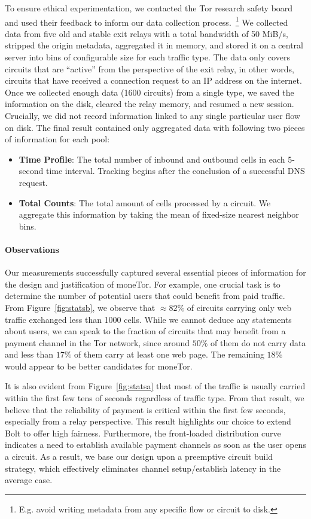 To ensure ethical experimentation, we contacted the Tor research safety board~\cite{torsafety} and used their feedback to inform our data collection process.~\footnote{E.g.
avoid writing metadata from any specific flow or circuit to disk.}
We collected data from five old and stable exit relays with a total bandwidth of 50 MiB/s, stripped the origin metadata, aggregated it in memory, and stored it on a central server into bins of configurable size for each traffic type.
The data only covers circuits that are ``active'' from the perspective of the exit relay, in other words, circuits that have received a connection request to an IP address on the internet.
Once we collected enough data (1600 circuits) from a single type, we saved the information on the disk, cleared the relay memory, and resumed a new session.
Crucially, we did not record information linked to any single particular user flow on disk.
The final result contained only aggregated data with following two pieces of information for each pool:

\begin{itemize}
\item \textbf{Time Profile}: The total number of inbound and outbound cells in each 5-second time interval. Tracking begins after the conclusion of a successful DNS request.
\item \textbf{Total Counts}: The total amount of cells processed by a circuit.
  We aggregate this information by taking the mean of fixed-size nearest neighbor bins.
\end{itemize}

\paragraph*{Observations}

Our measurements successfully captured several essential pieces of information for the design and justification of moneTor.
For example, one crucial task is to determine the number of potential users that could benefit from paid traffic.
From Figure~\ref{fig:statsb}, we observe that $\approx 82\%$ of circuits carrying only web traffic exchanged less than 1000 cells.
While we cannot deduce any statements about users, we can speak to the fraction of circuits that may benefit from a payment channel in the Tor network, since around $50\%$ of them do not carry data and less than $17\%$ of them carry at least one web page.
The remaining $18\%$ would appear to be better candidates for moneTor.

It is also evident from Figure~\ref{fig:statsa} that most of the traffic is usually carried within the first few tens of seconds regardless of traffic type.
From that result, we believe that the reliability of payment is critical within the first few seconds, especially from a relay perspective.
This result highlights our choice to extend Bolt to offer high fairness.
Furthermore, the front-loaded distribution curve indicates a need to establish available payment channels as soon as the user opens a circuit.
As a result, we base our design upon a preemptive circuit build strategy, which effectively eliminates channel setup/establish latency in the average case.
